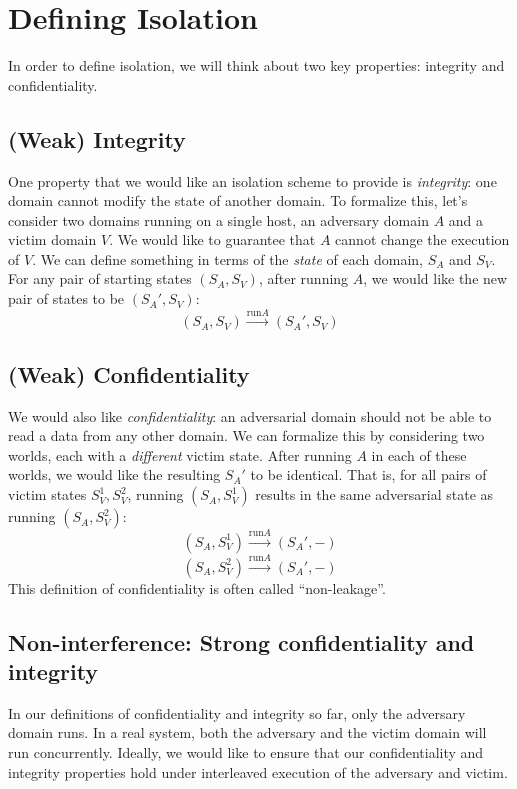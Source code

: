 \documentclass[
  letterpaper,
]{scrbook}
\theoremstyle{definition}
\theoremstyle{plain}
\theoremstyle{plain}
\theoremstyle{remark}
\begin{document}
\section{Defining Isolation}\label{defining-isolation}

In order to define isolation, we will think about two key properties:
integrity and confidentiality.

\subsection{(Weak) Integrity}\label{weak-integrity}

One property that we would like an isolation scheme to provide is
\emph{integrity}: one domain cannot modify the state of another domain.
To formalize this, let's consider two domains running on a single host,
an adversary domain \(A\) and a victim domain \(V\). We would like to
guarantee that \(A\) cannot change the execution of \(V\). We can define
something in terms of the \emph{state} of each domain, \(S_A\) and
\(S_V\). For any pair of starting states \((S_A, S_V)\), after running
\(A\), we would like the new pair of states to be \((S_A', S_V)\):
\[ (S_A, S_V) \xrightarrow{\text{run} A} (S_A', S_V) \]

\subsection{(Weak) Confidentiality}\label{weak-confidentiality}

We would also like \emph{confidentiality}: an adversarial domain should
not be able to read a data from any other domain. We can formalize this
by considering two worlds, each with a \emph{different} victim state.
After running \(A\) in each of these worlds, we would like the resulting
\(S_A'\) to be identical. That is, for all pairs of victim states
\(S_V^1, S_V^2\), running \((S_A, S_V^1)\) results in the same
adversarial state as running \((S_A, S_V^2)\):
\[ (S_A, S_V^1) \xrightarrow{\text{run} A} (S_A', -) \]
\[ (S_A, S_V^2) \xrightarrow{\text{run} A} (S_A', -) \] This definition
of confidentiality is often called ``non-leakage''.

\subsection{Non-interference: Strong confidentiality and
integrity}\label{non-interference-strong-confidentiality-and-integrity}

In our definitions of confidentiality and integrity so far, only the
adversary domain runs. In a real system, both the adversary and the
victim domain will run concurrently. Ideally, we would like to ensure
that our confidentiality and integrity properties hold under interleaved
execution of the adversary and victim.
\end{document}
